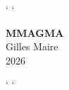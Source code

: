 {%
\catcode`\relax
\catcode`\relax
\pagecolor[rgb]{0.051,0.106,0.165}
}%
\begin{titlepage}
\vspace*{\fill}
\begin{center}
    {\fontsize{52}{62}\selectfont\bfseries\textcolor[rgb]{1,1,1}{MMAGMA}}\\[1.5cm]
    {\fontsize{22}{30}\selectfont\textcolor[rgb]{1,1,1}{Gilles Maire}}\\[0.8cm]
    {\fontsize{16}{24}\selectfont\textcolor[rgb]{1,1,1}{2026}}
\end{center}
\vspace*{\fill}
\end{titlepage}
{%
\catcode`\relax
\catcode`\relax
\pagecolor[rgb]{1,1,1}
\color[rgb]{0,0,0}
}%
